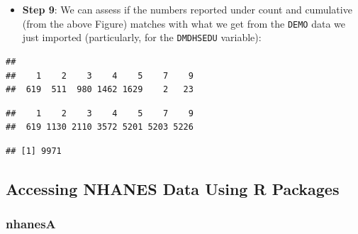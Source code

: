 \documentclass[
]{book}
\newenvironment{Shaded}{\begin{snugshade}}{\end{snugshade}}
\newcommand{\KeywordTok}[1]{\textcolor[rgb]{0.13,0.29,0.53}{\textbf{#1}}}
\newcommand{\NormalTok}[1]{#1}
\newcommand{\OperatorTok}[1]{\textcolor[rgb]{0.81,0.36,0.00}{\textbf{#1}}}
\providecommand{\tightlist}{%
  \setlength{\itemsep}{0pt}\setlength{\parskip}{0pt}}
\begin{document}
\begin{itemize}
\tightlist
\item
  \textbf{Step 9}: We can assess if the numbers reported under count and cumulative (from the above Figure) matches with what we get from the \texttt{DEMO} data we just imported (particularly, for the \texttt{DMDHSEDU} variable):
\end{itemize}

\begin{Shaded}
\end{Shaded}

\begin{verbatim}
## 
##    1    2    3    4    5    7    9 
##  619  511  980 1462 1629    2   23
\end{verbatim}

\begin{Shaded}
\end{Shaded}

\begin{verbatim}
##    1    2    3    4    5    7    9 
##  619 1130 2110 3572 5201 5203 5226
\end{verbatim}

\begin{Shaded}
\end{Shaded}

\begin{verbatim}
## [1] 9971
\end{verbatim}

\hypertarget{accessing-nhanes-data-using-r-packages}{%
\subsection{Accessing NHANES Data Using R Packages}\label{accessing-nhanes-data-using-r-packages}}

\hypertarget{nhanesa}{%
\subsubsection{nhanesA}\label{nhanesa}}
\end{document}
